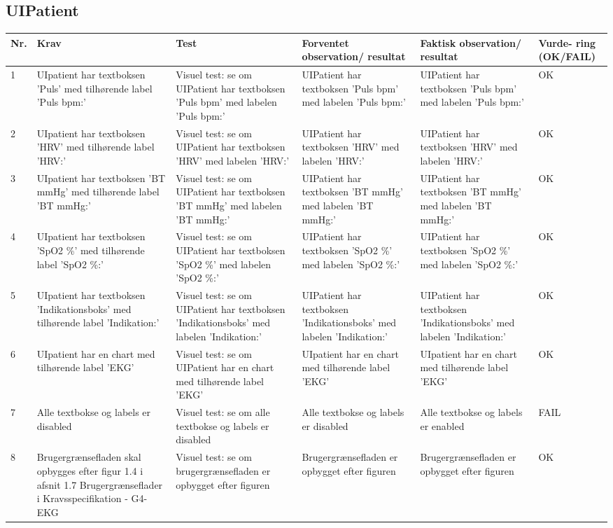 \subsection{UIPatient}
\begin{table}[H]
\begin{tabular}{|p{0.5cm}|p{4cm}|p{3cm}|p{3cm}|p{3cm}|p{1cm}|}
\hline
\textbf{Nr.} & \textbf{Krav} & \textbf{Test}& \textbf{Forventet observation/ resultat}& \textbf{Faktisk observation/ resultat}& \textbf{Vurde- ring (OK/FAIL)}\\\hline
 1 & UIpatient har textboksen 'Puls' med tilhørende label 'Puls bpm:' & Visuel test: se om UIPatient har textboksen 'Puls bpm' med labelen 'Puls bpm:' & UIPatient har textboksen 'Puls bpm' med labelen 'Puls bpm:' & UIPatient har textboksen 'Puls bpm' med labelen 'Puls bpm:' & OK \\\hline
 2 & UIpatient har textboksen 'HRV' med tilhørende label 'HRV:' & Visuel test: se om UIPatient har textboksen 'HRV' med labelen 'HRV:' & UIPatient har textboksen 'HRV' med labelen 'HRV:' & UIPatient har textboksen 'HRV' med labelen 'HRV:' & OK \\\hline 
 3 & UIpatient har textboksen 'BT mmHg' med tilhørende label 'BT mmHg:' & Visuel test: se om UIPatient har textboksen 'BT mmHg' med labelen 'BT mmHg:' & UIPatient har textboksen 'BT mmHg' med labelen 'BT mmHg:' & UIPatient har textboksen 'BT mmHg' med labelen 'BT mmHg:' & OK \\\hline 
 4 & UIpatient har textboksen 'SpO2 \%' med tilhørende label 'SpO2 \%:' & Visuel test: se om UIPatient har textboksen 'SpO2 \%' med labelen 'SpO2 \%:' & UIPatient har textboksen 'SpO2 \%' med labelen 'SpO2 \%:' & UIPatient har textboksen 'SpO2 \%' med labelen 'SpO2 \%:' & OK \\\hline 
 5 & UIpatient har textboksen 'Indikationsboks' med tilhørende label 'Indikation:' & Visuel test: se om UIPatient har textboksen 'Indikationsboks' med labelen 'Indikation:' & UIPatient har textboksen 'Indikationsboks' med labelen 'Indikation:' & UIPatient har textboksen 'Indikationsboks' med labelen 'Indikation:' & OK \\\hline
 6 & UIpatient har en chart med tilhørende label  'EKG' & Visuel test: se om UIPatient har en chart med tilhørende label 'EKG' & UIpatient har en chart med tilhørende label  'EKG' & UIpatient har en chart med tilhørende label  'EKG' & OK \\\hline
 7 & Alle textbokse og labels er disabled & Visuel test: se om alle textbokse og labels er disabled & Alle textbokse og labels er disabled & Alle textbokse og labels er enabled & FAIL \\\hline
 8 & Brugergrænsefladen skal opbygges efter figur 1.4 i afsnit 1.7 Brugergrænseflader i Kravsspecifikation - G4-EKG & Visuel test: se om brugergrænsefladen er opbygget efter figuren & Brugergrænsefladen er opbygget efter figuren & Brugergrænsefladen er opbygget efter figuren & OK \\\hline
 \end{tabular}
 \end{table}

